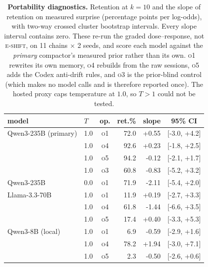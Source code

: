 \begin{table}[t]
\centering\small
\begin{tabular}{llcrrc}
\toprule
model & $T$ & op. & ret.\% & slope & 95\% CI \\
\midrule
Qwen3-235B (primary) & 1.0 & \textsc{o1} & 72.0 & +0.55 & [-3.0, +4.2] \\
 & 1.0 & \textsc{o4} & 92.6 & +0.23 & [-1.8, +2.5] \\
 & 1.0 & \textsc{o5} & 94.2 & -0.12 & [-2.1, +1.7] \\
 & 1.0 & \textsc{o3} & 60.8 & -0.83 & [-5.2, +3.2] \\
Qwen3-235B & 0.0 & \textsc{o1} & 71.9 & -2.11 & [-5.4, +2.0] \\
Llama-3.3-70B & 1.0 & \textsc{o1} & 11.9 & +0.19 & [-2.7, +3.3] \\
 & 1.0 & \textsc{o4} & 61.8 & -1.44 & [-6.6, +3.5] \\
 & 1.0 & \textsc{o5} & 17.4 & +0.40 & [-3.3, +5.3] \\
Qwen3-8B (local) & 1.0 & \textsc{o1} & 6.9 & -0.59 & [-2.9, +1.6] \\
 & 1.0 & \textsc{o4} & 78.2 & +1.94 & [-3.0, +7.1] \\
 & 1.0 & \textsc{o5} & 2.3 & -0.50 & [-2.6, +0.6] \\
\bottomrule
\end{tabular}
\caption{\textbf{Portability diagnostics.} Retention at $k{=}10$ and the slope of retention on measured surprise (percentage points per log-odds), with two-way crossed cluster bootstrap intervals. Every slope interval contains zero. These re-run the graded dose--response, not \textsc{e-shift}, on 11 chains $\times$ 2 seeds, and score each model against the \emph{primary} compactor's measured prior rather than its own. \textsc{o1} rewrites its own memory, \textsc{o4} rebuilds from the raw sessions, \textsc{o5} adds the Codex anti-drift rules, and \textsc{o3} is the prior-blind control (which makes no model calls and is therefore reported once). The hosted proxy caps temperature at $1.0$, so $T>1$ could not be tested.}
\label{tab:robust}
\end{table}
